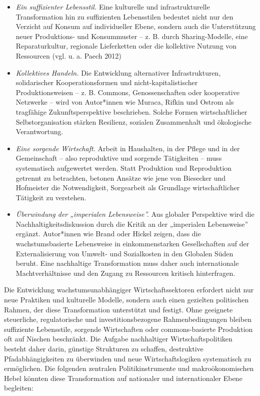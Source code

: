 \documentclass[
  nswissgerman,
  a4paper,
  openany]{book}
\begin{document}
\begin{itemize}
\item
  \emph{Ein suffizienter Lebensstil.} Eine kulturelle und
  infrastrukturelle Transformation hin zu suffizienten Lebensstilen
  bedeutet nicht nur den Verzicht auf Konsum auf individueller Ebene,
  sondern auch die Unterstützung neuer Produktions- und Konsummuster --
  z. B. durch Sharing-Modelle, eine Reparaturkultur, regionale
  Lieferketten oder die kollektive Nutzung von Ressourcen (vgl. u. a.
  Paech 2012)
\item
  \emph{Kollektives Handeln.} Die Entwicklung alternativer
  Infrastrukturen, solidarischer Kooperationsformen und
  nicht-kapitalistischer Produktionsweisen -- z. B. Commons,
  Genossenschaften oder kooperative Netzwerke -- wird von Autor*innen
  wie Muraca, Rifkin und Ostrom als tragfähige Zukunftsperspektive
  beschrieben. Solche Formen wirtschaftlicher Selbstorganisation stärken
  Resilienz, sozialen Zusammenhalt und ökologische Verantwortung.
\item
  \emph{Eine sorgende Wirtschaft.} Arbeit in Haushalten, in der Pflege
  und in der Gemeinschaft -- also reproduktive und sorgende Tätigkeiten
  -- muss systematisch aufgewertet werden. Statt Produktion und
  Reproduktion getrennt zu betrachten, betonen Ansätze wie jene von
  Biesecker und Hofmeister die Notwendigkeit, Sorgearbeit als Grundlage
  wirtschaftlicher Tätigkeit zu verstehen.
\item
  \emph{Überwindung der „imperialen Lebensweise''.} Aus globaler
  Perspektive wird die Nachhaltigkeitsdiskussion durch die Kritik an der
  „imperialen Lebensweise'' ergänzt. Autor*innen wie Brand oder Hickel
  zeigen, dass die wachstumsbasierte Lebensweise in einkommenstarken
  Gesellschaften auf der Externalisierung von Umwelt- und Sozialkosten
  in den Globalen Süden beruht. Eine nachhaltige Transformation muss
  daher auch internationale Machtverhältnisse und den Zugang zu
  Ressourcen kritisch hinterfragen.
\end{itemize}

Die Entwicklung wachstumsunabhängiger Wirtschaftssektoren erfordert
nicht nur neue Praktiken und kulturelle Modelle, sondern auch einen
gezielten politischen Rahmen, der diese Transformation unterstützt und
festigt. Ohne geeignete steuerliche, regulatorische und
investitionsbezogene Rahmenbedingungen bleiben suffiziente Lebensstile,
sorgende Wirtschaften oder commons-basierte Produktion oft auf Nischen
beschränkt. Die Aufgabe nachhaltiger Wirtschaftspolitiken besteht daher
darin, günstige Strukturen zu schaffen, destruktive Pfadabhängigkeiten
zu überwinden und neue Wirtschaftslogiken systematisch zu ermöglichen.
Die folgenden zentralen Politikinstrumente und makroökonomischen Hebel
könnten diese Transformation auf nationaler und internationaler Ebene
begleiten:
\end{document}
